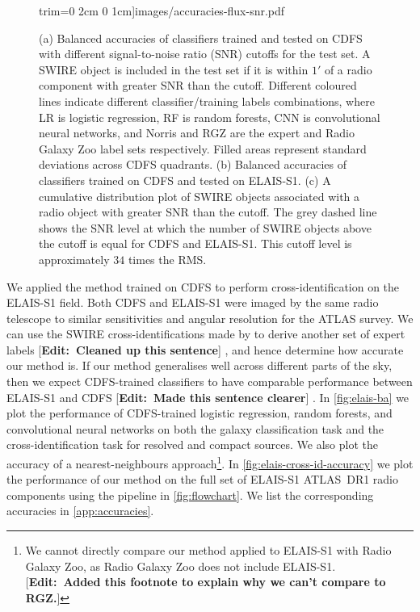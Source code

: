\documentclass[fleqn,usenatbib,usedcolumn]{mnras}
\newcommand{\edit}[1]{ {\color{red}[{\bf Edit:~{#1}}]} }
\begin{document}
\begin{figure}
                     trim={0 2cm 0 1cm}]{images/accuracies-flux-snr.pdf}
    \caption{(a) Balanced accuracies of classifiers trained and tested on CDFS
      with different signal-to-noise ratio (SNR) cutoffs for the test set. A
      SWIRE object is included in the test set if it is within $1'$ of a radio
      component with greater SNR than the cutoff. Different coloured lines
      indicate different classifier/training labels combinations, where LR is
      logistic regression, RF is random forests, CNN is convolutional neural
      networks, and Norris and RGZ are the expert and Radio Galaxy Zoo label
      sets respectively. Filled areas represent standard deviations across
      CDFS quadrants. (b) Balanced accuracies of classifiers trained on CDFS
      and tested on ELAIS-S1. (c) A cumulative distribution plot of SWIRE
      objects associated with a radio object with greater SNR than the cutoff.
      The grey dashed line shows the SNR level at which the number of SWIRE
      objects above the cutoff is equal for CDFS and ELAIS-S1. This cutoff level
      is approximately $34$ times the RMS.}
    \label{fig:accuracies-flux}
  \end{figure}

  We applied the method trained on CDFS to perform cross-identification on the ELAIS-S1 field. Both CDFS and ELAIS-S1 were imaged by the same radio telescope to similar sensitivities and angular resolution for the ATLAS survey. We can use the SWIRE cross-identifications made by \citet{middelberg08} to derive another set of expert labels \edit{Cleaned up this sentence}, and hence determine how accurate our method is. If our method generalises well across different parts of the sky, then we expect CDFS-trained classifiers to have comparable performance between ELAIS-S1 and CDFS \edit{Made this sentence clearer}. In \autoref{fig:elais-ba} we plot the performance of CDFS-trained logistic regression, random forests, and convolutional neural networks on both the galaxy classification task and the cross-identification task for resolved and compact sources. We also plot the accuracy of a nearest-neighbours approach\footnote{We cannot directly compare our method applied to ELAIS-S1 with Radio Galaxy Zoo, as Radio Galaxy Zoo does not include ELAIS-S1. \edit{Added this footnote to explain why we can't compare to RGZ.}}. In \autoref{fig:elais-cross-id-accuracy} we plot the performance of our method on the full set of ELAIS-S1 ATLAS~DR1 radio components using the pipeline in \autoref{fig:flowchart}. We list the corresponding accuracies in \autoref{app:accuracies}.
\end{document}
